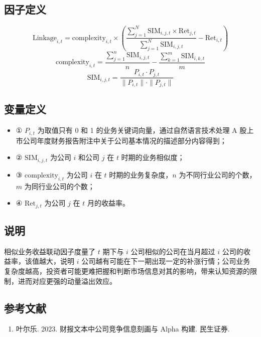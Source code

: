 \documentclass{article}
\begin{document}
\subsection{因子定义}
\begin{equation}
    \mathrm{Linkage}_{i,t} = \mathrm{complexity}_{i,t} \times \left( \frac{\sum_{j=1}^{N} \mathrm{SIM}_{i,j,t} \times \mathrm{Ret}_{j,t}}{\sum_{j=1}^{N} \mathrm{SIM}_{i,j,t}} - \mathrm{Ret}_{i,t} \right)
\end{equation}
\begin{equation}
    \mathrm{complexity}_{i,t} = \frac{\sum_{j=1}^{n} \mathrm{SIM}_{i,j,t}}{n} - \frac{\sum_{k=1}^{m} \mathrm{SIM}_{i,k,t}}{m}
\end{equation}
\begin{equation}
    \mathrm{SIM}_{i,j,t} = \frac{P_{i,t} \cdot P_{j,t}}{\|P_{i,t}\| \cdot \|P_{j,t}\|}
\end{equation}

\subsection{变量定义}
\begin{itemize}
    \item ① \( P_{i,t} \) 为取值只有 0 和 1 的业务关键词向量，通过自然语言技术处理 A 股上市公司年度财务报告附注中关于公司基本情况的描述部分内容得到；
    \item ② \( \mathrm{SIM}_{i,j,t} \) 为公司 \( i \) 和公司 \( j \) 在 \( t \) 时期的业务相似度；
    \item ③ \( \mathrm{complexity}_{i,t} \) 为公司 \( i \) 在 \( t \) 时期的业务复杂度，\( n \) 为不同行业公司的个数，\( m \) 为同行业公司的个数；
    \item ④ \( \mathrm{Ret}_{j,t} \) 为公司 \( j \) 在 \( t \) 月的收益率。
\end{itemize}

\subsection{说明}
相似业务收益联动因子度量了 \( t \) 期下与 \( i \) 公司相似的公司在当月超过 \( i \) 公司的收益率，该值越大，说明 \( i \) 公司越有可能在下一期出现一定的补涨行情；公司业务复杂度越高，投资者可能更难把握和判断市场信息对其的影响，带来认知资源的限制，进而对应更强的动量溢出效应。

\subsection{参考文献}
\begin{enumerate}
    \item 叶尔乐. 2023. 财报文本中公司竞争信息刻画与 Alpha 构建. 民生证券.
\end{enumerate}
\end{document}
